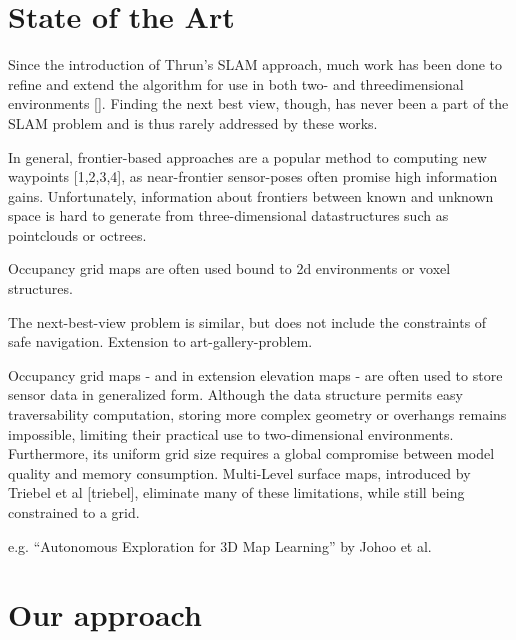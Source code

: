 \documentclass[a4paper, 10pt, conference]{ieeeconf}      %
\begin{document}
\section{State of the Art}

Since the introduction of Thrun's SLAM approach, much work has been done to refine and extend the algorithm for use in both two- and threedimensional environments []. Finding the next best view, though, has never been a part of the SLAM problem and is thus rarely addressed by these works.

In general, frontier-based approaches are a popular method to computing new waypoints [1,2,3,4], as near-frontier sensor-poses often promise high information gains. Unfortunately, information about frontiers between known and unknown space is hard to generate from three-dimensional datastructures such as pointclouds or octrees.

Occupancy grid maps are often used bound to 2d environments or voxel structures.

The next-best-view problem is similar, but does not include the constraints of safe navigation. Extension to art-gallery-problem.

Occupancy grid maps - and in extension elevation maps - are often used to store sensor data in generalized form. Although the data structure permits easy traversability computation, storing more complex geometry or overhangs remains impossible, limiting their practical use to two-dimensional environments. Furthermore, its uniform grid size requires a global compromise between model quality and memory consumption. Multi-Level surface maps, introduced by Triebel et al [triebel], eliminate many of these limitations, while still being constrained to a grid.

e.g. ``Autonomous Exploration for 3D Map Learning'' by Johoo et al.

\section{Our approach}
\end{document}
